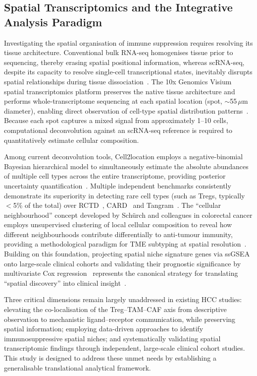 \documentclass[12pt, a4paper]{article}
\begin{document}
\subsection{Spatial Transcriptomics and the Integrative Analysis Paradigm}

Investigating the spatial organisation of immune suppression requires resolving its tissue architecture. Conventional bulk RNA-seq homogenises tissue prior to sequencing, thereby erasing spatial positional information, whereas scRNA-seq, despite its capacity to resolve single-cell transcriptional states, inevitably disrupts spatial relationships during tissue dissociation~\citep{luecken2019current}. The 10x Genomics Visium spatial transcriptomics platform preserves the native tissue architecture and performs whole-transcriptome sequencing at each spatial location (spot, $\sim$55\,$\mu$m diameter), enabling direct observation of cell-type spatial distribution patterns~\citep{williams2022introduction}. Because each spot captures a mixed signal from approximately 1--10 cells, computational deconvolution against an scRNA-seq reference is required to quantitatively estimate cellular composition.

Among current deconvolution tools, Cell2location employs a negative-binomial Bayesian hierarchical model to simultaneously estimate the absolute abundances of multiple cell types across the entire transcriptome, providing posterior uncertainty quantification~\citep{kleshchevnikov2022cell2location}. Multiple independent benchmarks consistently demonstrate its superiority in detecting rare cell types (such as Tregs, typically $<$5\% of the total) over RCTD~\citep{cable2021robust}, CARD~\citep{ma2022integrative} and Tangram~\citep{biancalani2021deep,li2022benchmarking,sang2024spotless,yan2023benchmarking}. The ``cellular neighbourhood'' concept developed by Schürch and colleagues in colorectal cancer employs unsupervised clustering of local cellular composition to reveal how different neighbourhoods contribute differentially to anti-tumour immunity, providing a methodological paradigm for TME subtyping at spatial resolution~\citep{schurch2020coordinated}. Building on this foundation, projecting spatial niche signature genes via ssGSEA~\citep{barbie2009systematic} onto large-scale clinical cohorts and validating their prognostic significance by multivariate Cox regression~\citep{cox1972regression} represents the canonical strategy for translating ``spatial discovery'' into clinical insight~\citep{hanzelmann2013gsva}.

Three critical dimensions remain largely unaddressed in existing HCC studies: elevating the co-localisation of the Treg--TAM--CAF axis from descriptive observation to mechanistic ligand--receptor communication, while preserving spatial information; employing data-driven approaches to identify immunosuppressive spatial niches; and systematically validating spatial transcriptomic findings through independent, large-scale clinical cohort studies. This study is designed to address these unmet needs by establishing a generalisable translational analytical framework.
\end{document}
